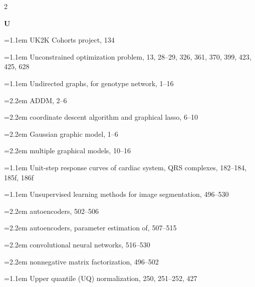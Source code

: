 \begin{multicols}{2}
\par{}\medskip\noindent\textbf{U}\par\nobreak\smallskip\nobreak
\noindent\hangindent=1.1em UK2K Cohorts project, 134\par
\noindent\hangindent=1.1em Unconstrained optimization problem, 13, 28--29, 326, 361, 370, 399, 423, 425, 628\par
\noindent\hangindent=1.1em Undirected graphs, for genotype network, 1--16\par
\noindent\hangindent=2.2em \hspace*{1.1em}ADDM, 2--6\par
\noindent\hangindent=2.2em \hspace*{1.1em}coordinate descent algorithm and graphical lasso, 6--10\par
\noindent\hangindent=2.2em \hspace*{1.1em}Gaussian graphic model, 1--6\par
\noindent\hangindent=2.2em \hspace*{1.1em}multiple graphical models, 10--16\par
\noindent\hangindent=1.1em Unit-step response curves of cardiac system, QRS complexes, 182--184, 185f, 186f\par
\noindent\hangindent=1.1em Unsupervised learning methods for image segmentation, 496--530\par
\noindent\hangindent=2.2em \hspace*{1.1em}autoencoders, 502--506\par
\noindent\hangindent=2.2em \hspace*{1.1em}autoencoders, parameter estimation of, 507--515\par
\noindent\hangindent=2.2em \hspace*{1.1em}convolutional neural networks, 516--530\par
\noindent\hangindent=2.2em \hspace*{1.1em}nonnegative matrix factorization, 496--502\par
\noindent\hangindent=1.1em Upper quantile (UQ) normalization, 250, 251--252, 427\par


\end{multicols}
